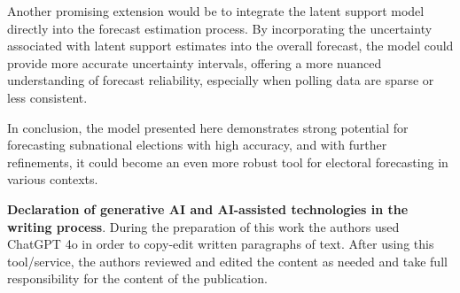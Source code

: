 \documentclass[12pt]{article}
\begin{document}
\begin{doublespacing}
Another promising extension would be to integrate the latent support model directly into the forecast estimation process. By incorporating the uncertainty associated with latent support estimates into the overall forecast, the model could provide more accurate uncertainty intervals, offering a more nuanced understanding of forecast reliability, especially when polling data are sparse or less consistent. 

In conclusion, the model presented here demonstrates strong potential for forecasting subnational elections with high accuracy, and with further refinements, it could become an even more robust tool for electoral forecasting in various contexts.




\end{doublespacing}





\newpage



\clearpage

\newpage
\appendix

\textbf{Declaration of generative AI and AI-assisted technologies in the writing process}. During the preparation of this work the authors used ChatGPT 4o in order to copy-edit written paragraphs of text. After using this tool/service, the authors reviewed and edited the content as needed and take full responsibility for the content of the publication.
\end{document}
